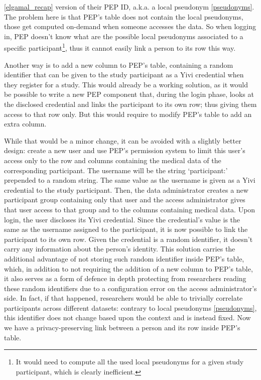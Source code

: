 \documentclass{report}
\begin{document}
\ref{elgamal_recap} version of their PEP ID, a.k.a. a local pseudonym \ref{pseudonyms}. The problem here is that PEP's table does not contain the local pseudonyms, those get
computed on-demand when someone accesses the data. So when logging in, PEP doesn't know what are the possible local pseudonyms associated to a specific participant\footnote{It
would need to compute all the used local pseudonyms for a given study participant, which is clearly inefficient.}, thus it cannot easily link a person to its row this way. \par
Another way is to add a new column to PEP's table, containing a random identifier that can be given to the study participant as a Yivi credential when they register for a study.
This would already be a working solution, as it would be possible to write a new PEP component that, during the login phase, looks at the disclosed credential and links the
participant to its own row; thus giving them access to that row only. But this would require to modify PEP's table to add an extra column. \par 
While that would be a minor change,
it can be avoided with a slightly better design: create a new user and use PEP's permission system to limit this user's access only to the row and columns containing
the medical data of the corresponding participant. The username will be the string \enquote*{participant:} prepended to a random string. The same value as the username is given as
a Yivi credential to the study participant. Then, the data administrator creates a new participant group containing only that user and the access administrator gives that user
access to that group and to the columns containing medical data. Upon login, the user discloses its Yivi credential. Since the credential's value is the same as the username
assigned to the participant, it is now possible to link the participant to its own row. Given the credential is a random identifier, it doesn't carry any information about the
person's identity. This solution carries the additional advantage of not storing such random identifier inside PEP's table, which, in addition to not requiring the addition of a
new column to PEP's table, it also serves as a form of defence in depth protecting from researchers reading these random identifiers due to a configuration error on the access
administrator's side. In fact, if that happened, researchers would be able to trivially correlate participants across different datasets: contrary to local pseudonyms
\ref{pseudonyms}, this identifier does not change based upon the context and is instead fixed. Now we have a privacy-preserving link between a person and its row inside PEP's
table.  
\end{document}
